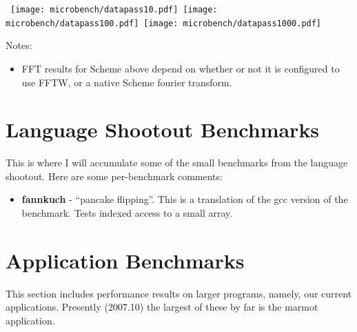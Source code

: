 \documentclass{article}
\begin{document}
\begin{center}
\hbox{
\texttt{[image: microbench/datapass10.pdf]}
\texttt{[image: microbench/datapass100.pdf]}
\texttt{[image: microbench/datapass1000.pdf]}
}
\end{center}

Notes:
\begin{itemize}
\item FFT results for Scheme above depend on whether or not it is
  configured to use FFTW, or a native Scheme fourier transform.
\end{itemize}



\section{Language Shootout Benchmarks}

This is where I will accumulate some of the small benchmarks from the
language shootout.  Here are some per-benchmark comments:

\begin{itemize}
\item {\bf fannkuch} - ``pancake flipping''.  This is a translation of the
  gcc version of the benchmark.  Tests indexed access to a small array.
\end{itemize}

\begin{center}
\end{center}



\section{Application Benchmarks}

This section includes performance results on larger programs, namely, our
current applications.  Presently (2007.10) the largest of these by far
is the marmot application.
\end{document}

